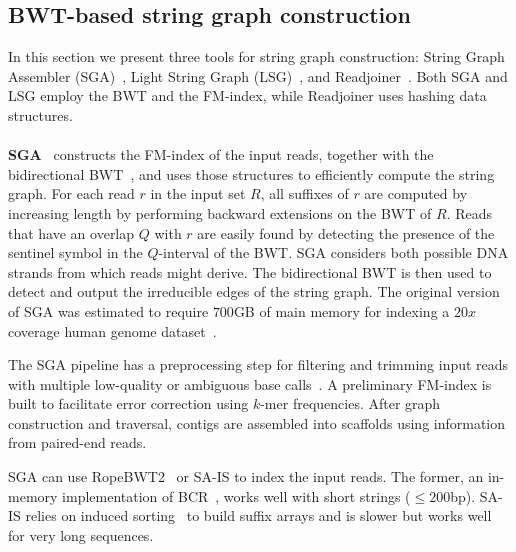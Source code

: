 \documentclass[11pt,oneside,a4paper]{article}
\begin{document}
\subsection{BWT-based  string graph construction}

In this section we present three tools for string graph construction: String Graph Assembler (SGA)~\cite{Simpson2010,Simpson2012}, Light String Graph (LSG)~\cite{Bonizzoni2015}, and Readjoiner~\cite{readjoiner}.
%
Both SGA and LSG employ the BWT and the FM-index, while Readjoiner uses hashing data structures.

\paragraph{}
\textbf{SGA}~\cite{Simpson2010, Simpson2012} constructs the FM-index of the input reads, together with the bidirectional BWT~\cite{Lam2009}, and uses those structures to
efficiently compute the string graph. For each  read $r$ in the input set $R$, all 
suffixes of $r$ are computed by increasing length by performing backward
extensions on the BWT of $R$. Reads that have an overlap $Q$ with $r$ are easily found by detecting the presence of the sentinel symbol in the $Q$-interval of the BWT. SGA considers both possible DNA strands from which reads might derive. The bidirectional BWT is then used to detect and output the irreducible edges of the string graph.
The original version of SGA was estimated to require $700$GB of main memory for indexing a $20x$ coverage human genome dataset~\cite{Simpson2010}.

The SGA pipeline has a preprocessing step for filtering and trimming input
reads with multiple low-quality or ambiguous base calls~\cite{Simpson2012}.
A preliminary FM-index is built to facilitate error correction using $k$-mer frequencies. After graph construction and traversal, contigs are assembled into scaffolds using information from paired-end reads.

SGA can use RopeBWT2~\cite{Li15112014} or SA-IS to index the
input reads. The former, an in-memory
implementation of BCR~\cite{Bauer2011}, works well with short strings ($\leq 200$bp).
SA-IS relies on induced
sorting~\cite{nong_two_2011} to build suffix arrays and is slower but works well for very long sequences.
%
%
\end{document}
